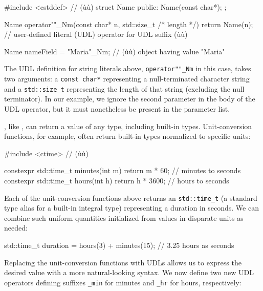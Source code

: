 \begin{emcppshiddenlisting}[emcppsbatch=e3]
#include <cstddef>  // (ù{}ù)
struct Name
{
public:
    Name(const char*);
};
\end{emcppshiddenlisting}
\begin{emcppslisting}[emcppsbatch=e3]
Name operator""_Nm(const char* n, std::size_t /* length */) { return Name(n); }
    // user-defined literal (UDL) operator for UDL suffix (ù{}ù)

Name nameField = "Maria"_Nm;  // (ù{}ù) object having value "Maria"
\end{emcppslisting}
    
\noindent The UDL definition for string literals above, \lstinline!operator""_Nm! in
this case, takes two arguments: a \lstinline!const!~\lstinline!char*!
representing a null-terminated character string and a
\lstinline!std::size_t! representing the length of that string (excluding
the null terminator). In our example, we ignore the second parameter in
the body of the UDL operator, but it must nonetheless be present in the
parameter list.

, like , can return a
value of any type, including built-in types. Unit-conversion functions,
for example, often return built-in types normalized to specific units:

\begin{emcppslisting}[emcppsbatch={e4,e5}]
#include <ctime>  // (ù{}ù)

constexpr std::time_t minutes(int m) { return m * 60; }    // minutes to seconds
constexpr std::time_t hours(int h)   { return h * 3600; }  // hours to seconds
\end{emcppslisting}
    
\noindent Each of the unit-conversion functions above returns an
\lstinline!std::time_t! (a standard type alias for a built-in integral
type) representing a duration in seconds. We can combine such uniform
quantities initialized from values in disparate units as needed:

\begin{emcppslisting}[emcppsbatch=e4]
std::time_t duration = hours(3) + minutes(15);   // 3.25 hours as seconds
\end{emcppslisting}
    
\noindent Replacing the unit-conversion functions with UDLs allows us to express
the desired value with a more natural-looking syntax. We now define two
new UDL operators defining suffixes \lstinline!_min! for minutes and
\lstinline!_hr! for hours, respectively:

